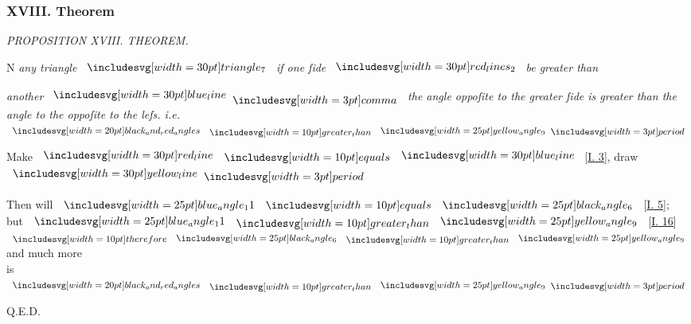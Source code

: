 \documentclass[11pt,preview]{standalone}
\begin{document}
\subsubsection{XVIII. Theorem}

\hfill

\begin{minipage}[t]{0.43\textwidth}
    \vspace{20pt}
    
\end{minipage}%
\hfill
\begin{minipage}[t]{0.54\textwidth}
    \begin{center}
        \textit{PROPOSITION XVIII. THEOREM.}\label{book1pr18} \\
    \end{center}

    \hfill

    \begin{center}
        \raggedright \lettrine[lines=3, loversize=1, nindent=0pt]{}{}N \textit{any triangle} $\img[0][0][30]{triangle_7}$ \textit{if one ſide} $\img[0.5][0][30]{red_lines_2}$ \textit{be greater than}
    \end{center}
    \textit{another} $\blueline \bcomma$ \textit{the angle oppoſite to the greater ſide is greater than the angle to the oppoſite to the leſs. i.e.} $\img[0][0][20]{black_and_red_angles} \bgt \img{yellow_angle_9} \bperiod$
\end{minipage}

\hfill

\hfill

{\vspace{1ex}\begin{center}
        Make $\redline \bequals \blueline$ [\hyperref[book1pr3]{\textsc{I.} 3}], draw $\yellowline \bperiod$
    \end{center}}

\hfill

\begin{center}
    Then will $\img{blue_angle_11} \bequals \img{black_angle_6}$ [\hyperref[book1pr5]{\textsc{I.} 5}];\\
    but $\img{blue_angle_11} \bgt \img{yellow_angle_9}$ [\hyperref[book1pr16]{\textsc{I.} 16}]\\
    $\btherefore \img{black_angle_6} \bgt \img{yellow_angle_9}$ and much more\\
    is $\img[0][0][20]{black_and_red_angles} \bgt \img{yellow_angle_9} \bperiod$
\end{center}

\hfill

\hfill Q.E.D.
\end{document}
